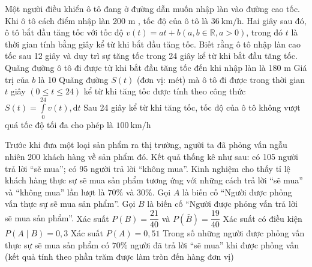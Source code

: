 \documentclass[12pt,a4paper]{article}
\begin{document}
\begin{ex}%
Một người điều khiển ô tô đang ở đường dẫn muốn nhập làn vào đường cao tốc. Khi ô tô cách điểm nhập làn 200 m , tốc độ của ô tô là $36 \mathrm{~km}/ \mathrm{h}$. Hai giây sau đó, ô tô bắt đầu tăng tốc với tốc độ $v(t)=a t+b(a, b \in \mathbb{R}, a>0)$, trong đó $t$ là thời gian tính bằng giây kể từ khi bắt đầu tăng tốc. Biết rằng ô tô nhập làn cao tốc sau 12 giây và duy trì sự tăng tốc trong 24 giây kể từ khi bắt đầu tăng tốc.
\choiceTFt
{\True Quãng đường ô tô đi được từ khi bắt đầu tăng tốc đến khi nhập làn là 180 m }
{\True Giá trị của $b$ là 10 }
{Quãng đường $S(t)$ (đơn vị: mét) mà ô tô đi được trong thời gian $t$ giây $(0 \leq t \leq 24)$ kể từ khi tăng tốc được tính theo công thức $S(t)=\displaystyle\int\limits_0^{24}v(t) \mathrm{,d}t$}
{Sau 24 giây kể từ khi tăng tốc, tốc độ của ô tô không vượt quá tốc độ tối đa cho phép là $100 \mathrm{~km}/ \mathrm{h}$}
\end{ex}

\begin{ex}%
Trước khi đưa một loại sản phẩm ra thị trường, người ta đã phỏng vấn ngẫu nhiên 200 khách hàng về sản phẩm đó. Kết quả thống kê như sau: có 105 người trả lời ``sẽ mua''; có 95 người trả lời ``không mua''. Kinh nghiệm cho thấy tỉ lệ khách hàng thực sự sẽ mua sản phẩm tương ứng với những cách trả lời ``sẽ mua'' và ``không mua'' lần lượt là $70 \%$ và $30 \%$.
Gọi $A$ là biến cố ``Người được phỏng vấn thực sự sẽ mua sản phẩm''.
Gọi $B$ là biến cố ``Người được phỏng vấn trả lời sẽ mua sản phẩm''.
\choiceTFt
{\True Xác suất $P(B)=\dfrac{21}{40}$ và $P(\bar{B})=\dfrac{19}{40}$}
{Xác suất có điều kiện $P(A \mid B)=0,3$}
{\True Xác suất $P(A)=0,51$}
{Trong số những người được phỏng vấn thực sự sẽ mua sản phẩm có $70 \%$ người đã trả lời ``sẽ mua'' khi được phỏng vấn (kết quả tính theo phần trăm được làm tròn đến hàng đơn vị)}
\end{ex}
\end{document}
